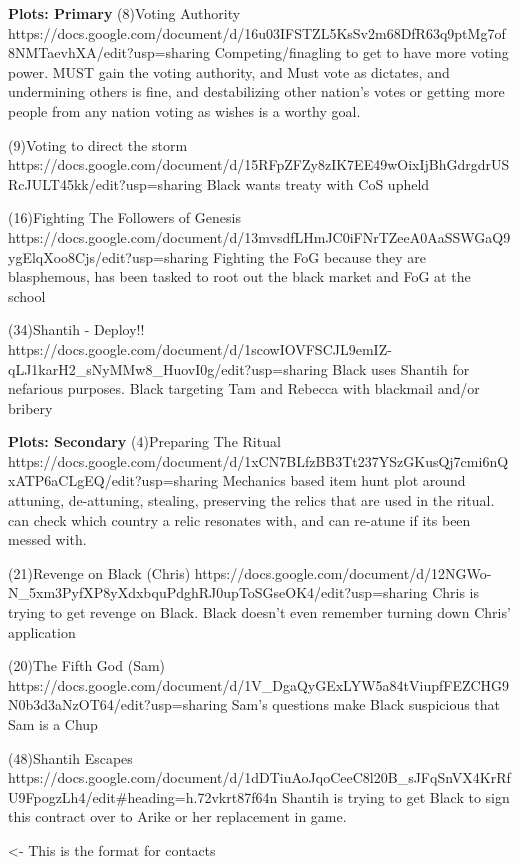 \documentclass[char]{GL2020}
\begin{document}
\textbf{Plots: Primary}
(8)Voting Authority
https://docs.google.com/document/d/16u03IFSTZL5KsSv2m68DfR63q9ptMg7of8NMTaevhXA/edit?usp=sharing
Competing/finagling to get to have more voting power.  \cScholarship{} MUST gain the voting authority, and Must vote as \cAntiChup{} dictates, and undermining others is fine, and destabilizing other nation's votes or getting more people from any nation voting as \cAntiChup{} wishes is a worthy goal.

(9)Voting to direct the storm
https://docs.google.com/document/d/15RFpZFZy8zIK7EE49wOixIjBhGdrgdrUSRcJULT45kk/edit?usp=sharing
Black wants treaty with CoS upheld

(16)Fighting The Followers of Genesis
https://docs.google.com/document/d/13mvsdfLHmJC0iFNrTZeeA0AaSSWGaQ9ygElqXoo8Cjs/edit?usp=sharing
Fighting the FoG because they are blasphemous, has been tasked to root out the black market and FoG at the school 

(34)Shantih - Deploy!!
https://docs.google.com/document/d/1scowIOVFSCJL9emIZ-qLJ1karH2_sNyMMw8_HuovI0g/edit?usp=sharing
Black uses Shantih for nefarious purposes.  Black targeting Tam and Rebecca with blackmail and/or bribery

\textbf{Plots: Secondary}
(4)Preparing The Ritual 
https://docs.google.com/document/d/1xCN7BLfzBB3Tt237YSzGKusQj7cmi6nQxATP6aCLgEQ/edit?usp=sharing
Mechanics based item hunt plot around attuning, de-attuning, stealing, preserving the relics that are used in the ritual. \cAntiChup{} can check which country a relic resonates with, and can re-atune if its been messed with.

(21)Revenge on Black (Chris)
https://docs.google.com/document/d/12NGWo-N_5xm3PyfXP8yXdxbquPdghRJ0upToSGseOK4/edit?usp=sharing
Chris is trying to get revenge on Black.  Black doesn't even remember turning down Chris' application

(20)The Fifth God (Sam)
https://docs.google.com/document/d/1V_DgaQyGExLYW5a84tViupfFEZCHG9N0b3d3aNzOT64/edit?usp=sharing
Sam's questions make Black suspicious that Sam is a Chup

(48)Shantih Escapes
https://docs.google.com/document/d/1dDTiuAoJqoCeeC8l20B_sJFqSnVX4KrRfU9FpogzLh4/edit#heading=h.72vkrt87f64n
Shantih is trying to get Black to sign this contract over to Arike or her replacement in game.

\begin{itemz}[Goals]
	\item 
\end{itemz}

\begin{itemz}[Notes]
	\item 
\end{itemz}

\begin{contacts}
	\contact{\cTest{}} <- This is the format for contacts 
\end{contacts}
\end{document}
